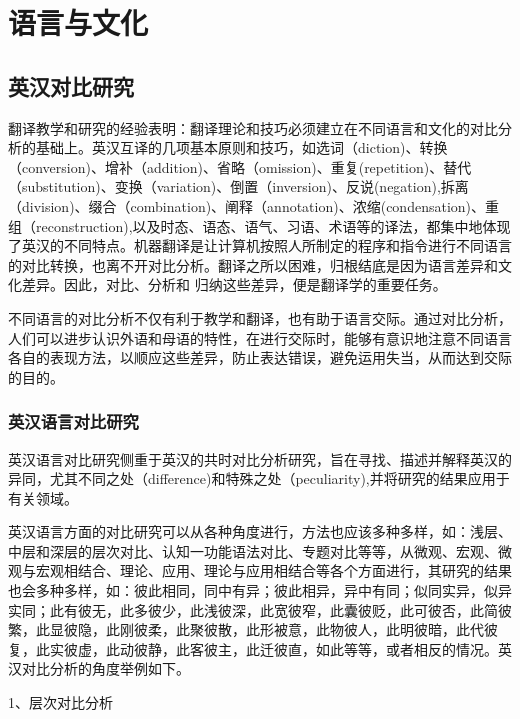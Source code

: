 \chapter{语言与文化}

\section{英汉对比研究}

翻译教学和研究的经验表明：翻译理论和技巧必须建立在不同语言和文化的对比分析的基础上。英汉互译的几项基本原则和技巧，如选词（diction)、转换（conversion)、增补（addition)、省略（omission)、重复(repetition)、替代（substitution)、变换（variation)、倒置（inversion)、反说(negation),拆离（division)、缀合（combination)、阐释（annotation)、浓缩(condensation)、重组（reconstruction),以及时态、语态、语气、习语、术语等的译法，都集中地体现了英汉的不同特点。机器翻译是让计算机按照人所制定的程序和指令进行不同语言的对比转换，也离不开对比分析。翻译之所以困难，归根结底是因为语言差异和文化差异。因此，对比、分析和
归纳这些差异，便是翻译学的重要任务。

不同语言的对比分析不仅有利于教学和翻译，也有助于语言交际。通过对比分析，人们可以进步认识外语和母语的特性，在进行交际时，能够有意识地注意不同语言各自的表现方法，以顺应这些差异，防止表达错误，避免运用失当，从而达到交际的目的。

\subsection{英汉语言对比研究}

英汉语言对比研究侧重于英汉的共时对比分析研究，旨在寻找、描述并解释英汉的异同，尤其不同之处（difference)和特殊之处（peculiarity),并将研究的结果应用于有关领域。

英汉语言方面的对比研究可以从各种角度进行，方法也应该多种多样，如：浅层、中层和深层的层次对比、认知一功能语法对比、专题对比等等，从微观、宏观、微观与宏观相结合、理论、应用、理论与应用相结合等各个方面进行，其研究的结果也会多种多样，如：彼此相同，同中有异；彼此相异，异中有同；似同实异，似异实同；此有彼无，此多彼少，此浅彼深，此宽彼窄，此囊彼贬，此可彼否，此简彼繁，此显彼隐，此刚彼柔，此聚彼散，此形被意，此物彼人，此明彼暗，此代彼复，此实彼虚，此动彼静，此客彼主，此迁彼直，如此等等，或者相反的情况。英汉对比分析的角度举例如下。

1、层次对比分析

